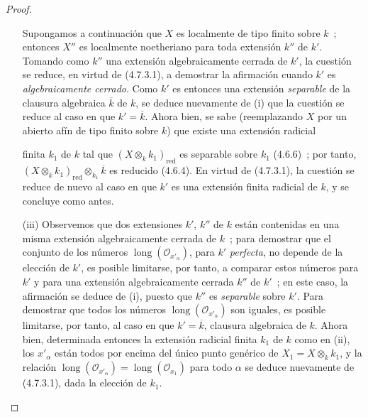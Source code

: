 \begin{proof}
\begin{enumerate}
Supongamos a continuación que $X$ es localmente de tipo finito sobre $k$~;
entonces $X''$ es localmente noetheriano para toda extensión $k''$ de $k'$.
Tomando como $k''$ una extensión algebraicamente cerrada de $k'$, la cuestión se reduce, en virtud de (4.7.3.1), a demostrar la afirmación cuando $k'$ es
\emph{algebraicamente cerrado}. Como $k'$ es entonces una extensión \emph{separable} de la
clausura algebraica $\overline k$ de $k$, se deduce nuevamente de (i) que
la cuestión se reduce al caso en que $k'=\overline k$. Ahora bien, se sabe
(reemplazando $X$ por un abierto afín de tipo finito sobre $k$) que existe una
extensión radicial


finita $k_1$ de $k$ tal que $(X\otimes_k k_1)_{\mathrm{red}}$ es separable sobre
$k_1$ (4.6.6)~; por tanto,
$(X\otimes_k k_1)_{\mathrm{red}}\otimes_{k_1}\overline k$ es reducido (4.6.4).
En virtud de (4.7.3.1), la cuestión se reduce de nuevo al caso en que $k'$ es una
extensión finita radicial de $k$, y se concluye como antes.

\item[(iii)] Observemos que dos extensiones $k'$, $k''$ de $k$ están contenidas
en una misma extensión algebraicamente cerrada de $k$~; para demostrar que el
conjunto de los números $\operatorname{long}(\mathcal O_{x'_\alpha})$, para
$k'$ \emph{perfecta}, no depende de la elección de $k'$, es posible limitarse, por
tanto, a comparar estos números para $k'$ y para una extensión algebraicamente
cerrada $k''$ de $k'$~; en este caso, la afirmación se deduce de (i), puesto que
$k''$ es \emph{separable} sobre $k'$. Para demostrar que todos los números
$\operatorname{long}(\mathcal O_{x'_\alpha})$ son iguales, es posible limitarse,
por tanto, al caso en que $k'=\overline k$, clausura algebraica de $k$. Ahora
bien, determinada entonces la extensión radicial finita $k_1$ de $k$ como en
(ii), los $x'_\alpha$ están todos por encima del único punto genérico de
$X_1=X\otimes_k k_1$, y la relación
$\operatorname{long}(\mathcal O_{x'_\alpha})=
\operatorname{long}(\mathcal O_{x_1})$ para todo $\alpha$ se deduce nuevamente
de (4.7.3.1), dada la elección de $k_1$.
\end{enumerate}
\end{proof}
